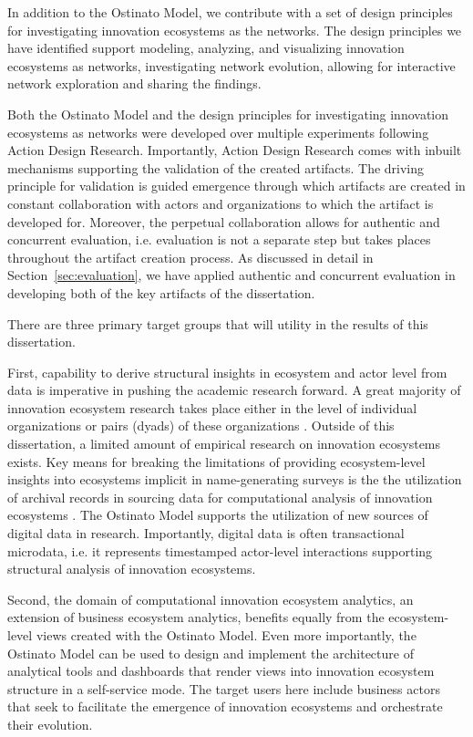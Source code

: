 In addition to the Ostinato Model, we contribute with a set of design principles for investigating innovation ecosystems as the networks. The design principles we have identified support modeling, analyzing, and visualizing innovation ecosystems as networks, investigating network evolution, allowing for interactive network exploration and sharing the findings. 

Both the Ostinato Model and the design principles for investigating innovation ecosystems as networks were developed over multiple experiments following Action Design Research. Importantly, Action Design Research comes with inbuilt mechanisms supporting the validation of the created artifacts. The driving principle for validation is guided emergence through which artifacts are created in constant collaboration with actors and organizations to which the artifact is developed for. Moreover, the perpetual collaboration allows for authentic and concurrent evaluation, i.e. evaluation is not a separate step but takes places throughout the artifact creation process. As discussed in detail in Section~\ref{sec:evaluation}, we have applied authentic and concurrent evaluation in developing both of the key artifacts of the dissertation.

There are three primary target groups that will utility in the results of this dissertation.

First, capability to derive structural insights in ecosystem and actor level from data is imperative in pushing the academic research forward. A great majority of innovation ecosystem research takes place either in the level of individual organizations or pairs (dyads) of these organizations \citep{Jarvi2016TakingReview}. Outside of this dissertation, a limited amount of empirical research on innovation ecosystems exists. Key means for breaking the limitations of providing ecosystem-level insights into ecosystems implicit in name-generating surveys is the the utilization of archival records in sourcing data for computational analysis of innovation ecosystems \citep[cf.][]{Williams2015MixedAnalysis}. The Ostinato Model supports the utilization of new sources of digital data in research. Importantly, digital data is often transactional microdata, i.e. it represents timestamped actor-level interactions supporting structural analysis of innovation ecosystems. 

Second, the domain of computational innovation ecosystem analytics, an extension of business ecosystem analytics, benefits equally from the ecosystem-level views created with the Ostinato Model. Even more importantly, the Ostinato Model can be used to design and implement the architecture of analytical tools and dashboards that render views into innovation ecosystem structure in a self-service mode. The target users here include business actors that seek to facilitate the emergence of innovation ecosystems and orchestrate their evolution. 

